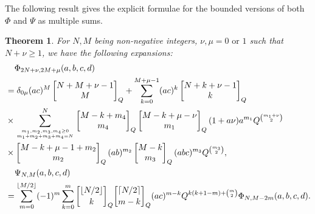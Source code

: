 \documentclass[12pt]{amsart}
\numberwithin{equation}{section}
\theoremstyle{plain}
\newtheorem{theorem}{Theorem}[section]
\theoremstyle{definition}
\newcommand\qbin[3]{\left[\begin{matrix} #1 \\ #2 \end{matrix} \right]_{#3}}
\begin{document}
The following result gives the explicit formulae for the bounded versions of
both $\Phi$ and $\Psi$ as multiple sums.
\begin{theorem}
\label{fznm}
For $N,M$ being non-negative integers, $\nu,\mu=0 \text{ or } 1$ such that $N+\nu\geq 1$, we have the following expansions:
\begin{align}\label{phinm}
&\phantom{=\;}\Phi_{2N+\nu,2M+\mu}(a,b,c,d) \\
\nonumber &=\delta_{0\mu}(ac)^M\qbin{N+M+\nu-1}{M}{Q}+\sum\limits_{k=0}^{M+\mu-1}(ac)^k\qbin{N+k+\nu-1}{k}{Q}\\
\nonumber &\times \sum\limits_{m_1,m_2,m_3,m_4\geq 0\atop m_1+m_2+m_3+m_4 = N}^{N}\qbin{M-k+m_4}{m_4}{Q}\qbin{M-k+\mu-\nu}{m_1}{Q}(1+a\nu)a^{m_1}Q^{\binom{m_1+\nu}{2}}\\
\nonumber &\times\qbin{M-k+\mu-1+m_2}{m_2}{Q}(ab)^{m_2}\qbin{M-k}{m_3}{Q}(abc)^{m_3}Q^{\binom{m_3}{2}},\\
\label{psinm}
&\phantom{=\;}\Psi_{N,M}(a,b,c,d) \\
\nonumber &=\sum_{m=0}^{\lfloor M/2\rfloor}(-1)^m
 \sum_{k=0}^m {{\lfloor N/2\rfloor} \brack k}_Q{{\lceil N/2\rceil} \brack m-k}_Q(ac)^{m-k} Q^{k(k+1-m)+{m\choose 2}}\Phi_{N,M-2m}(a,b,c,d).
\end{align}
\end{theorem}
\end{document}
